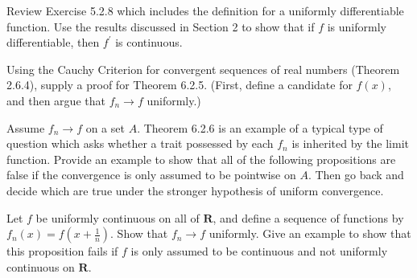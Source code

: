 \begin{exercise}
  Review Exercise 5.2.8 which includes the definition for a uniformly differentiable function. Use the results discussed in Section 2 to show that if $f$ is uniformly differentiable, then $f^{\prime}$ is continuous.

\end{exercise}
\begin{solution}
  \TODO
\end{solution}
\begin{exercise}
  Using the Cauchy Criterion for convergent sequences of real numbers (Theorem 2.6.4), supply a proof for Theorem 6.2.5. (First, define a candidate for $f(x)$, and then argue that $f_{n} \rightarrow f$ uniformly.)

\end{exercise}
\begin{solution}
  \TODO
\end{solution}
\begin{exercise}
  Assume $f_{n} \rightarrow f$ on a set $A$. Theorem 6.2.6 is an example of a typical type of question which asks whether a trait possessed by each $f_{n}$ is inherited by the limit function. Provide an example to show that all of the following propositions are false if the convergence is only assumed to be pointwise on $A$. Then go back and decide which are true under the stronger hypothesis of uniform convergence.
\end{exercise}
\begin{solution}
  \TODO
\end{solution}
\begin{exercise}
  Let $f$ be uniformly continuous on all of $\mathbf{R}$, and define a sequence of functions by $f_{n}(x)=f\left(x+\frac{1}{n}\right)$. Show that $f_{n} \rightarrow f$ uniformly. Give an example to show that this proposition fails if $f$ is only assumed to be continuous and not uniformly continuous on $\mathbf{R}$.

\end{exercise}
